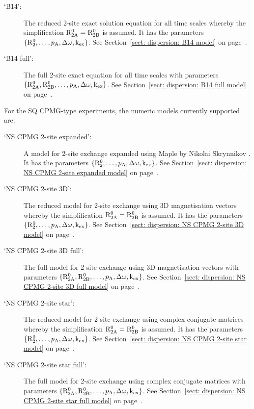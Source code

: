 \begin{description}
  \item[`B14':]  The reduced \citet{Baldwin2014} 2-site exact solution equation for all time scales whereby the simplification $\mathrm{R}_{\mathrm{2A}}^0 = \mathrm{R}_{\mathrm{2B}}^0$ is assumed.
    It has the parameters $\{\mathrm{R}_2^0, \dots, p_{\textrm{A}}, \Delta\omega, \textrm{k}_{\textrm{ex}}\}$.
    See Section~\ref{sect: dispersion: B14 model} on page~\pageref{sect: dispersion: B14 model}.
  \item[`B14 full':]  The full \citet{Baldwin2014} 2-site exact equation for all time scales with parameters $\{\mathrm{R}_{\mathrm{2A}}^0, \mathrm{R}_{\mathrm{2B}}^0, \dots, p_{\textrm{A}}, \Delta\omega, \textrm{k}_{\textrm{ex}}\}$.
    See Section~\ref{sect: dispersion: B14 full model} on page~\pageref{sect: dispersion: B14 full model}.
\end{description}

For the SQ CPMG-type experiments, the numeric models currently supported are:
\begin{description}
  \item[`NS CPMG 2-site expanded':]  A model for 2-site exchange expanded using Maple by Nikolai Skrynnikov \citep{Tollinger01}.
    It has the parameters $\{\mathrm{R}_2^0, \dots, p_{\textrm{A}}, \Delta\omega, \textrm{k}_{\textrm{ex}}\}$.
    See Section~\ref{sect: dispersion: NS CPMG 2-site expanded model} on page~\pageref{sect: dispersion: NS CPMG 2-site expanded model}.
  \item[`NS CPMG 2-site 3D':]  The reduced model for 2-site exchange using 3D magnetisation vectors whereby the simplification $\mathrm{R}_{\mathrm{2A}}^0 = \mathrm{R}_{\mathrm{2B}}^0$ is assumed.
    It has the parameters $\{\mathrm{R}_2^0, \dots, p_{\textrm{A}}, \Delta\omega, \textrm{k}_{\textrm{ex}}\}$.
    See Section~\ref{sect: dispersion: NS CPMG 2-site 3D model} on page~\pageref{sect: dispersion: NS CPMG 2-site 3D model}.
  \item[`NS CPMG 2-site 3D full':]  The full model for 2-site exchange using 3D magnetisation vectors with parameters $\{\mathrm{R}_{\mathrm{2A}}^0, \mathrm{R}_{\mathrm{2B}}^0, \dots, p_{\textrm{A}}, \Delta\omega, \textrm{k}_{\textrm{ex}}\}$.
    See Section~\ref{sect: dispersion: NS CPMG 2-site 3D full model} on page~\pageref{sect: dispersion: NS CPMG 2-site 3D full model}.
  \item[`NS CPMG 2-site star':]  The reduced model for 2-site exchange using complex conjugate matrices whereby the simplification $\mathrm{R}_{\mathrm{2A}}^0 = \mathrm{R}_{\mathrm{2B}}^0$ is assumed.
    It has the parameters $\{\mathrm{R}_2^0, \dots, p_{\textrm{A}}, \Delta\omega, \textrm{k}_{\textrm{ex}}\}$.
    See Section~\ref{sect: dispersion: NS CPMG 2-site star model} on page~\pageref{sect: dispersion: NS CPMG 2-site star model}.
  \item[`NS CPMG 2-site star full':]  The full model for 2-site exchange using complex conjugate matrices with parameters $\{\mathrm{R}_{\mathrm{2A}}^0, \mathrm{R}_{\mathrm{2B}}^0, \dots, p_{\textrm{A}}, \Delta\omega, \textrm{k}_{\textrm{ex}}\}$.
    See Section~\ref{sect: dispersion: NS CPMG 2-site star full model} on page~\pageref{sect: dispersion: NS CPMG 2-site star full model}.
\end{description}


